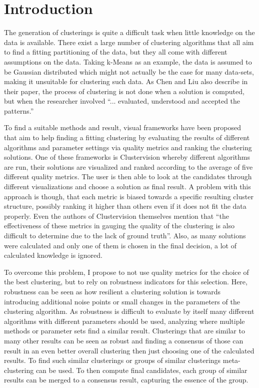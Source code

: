 \iffalse  \fi

\chapter{Introduction}
\label{cha:Introduction}

The generation of clusterings is quite a difficult task when little knowledge on the data is available. There exist a large number of clustering algorithms that all aim to find a fitting partitioning of the data, but they all come with different assumptions on the data. Taking k-Means as an example, the data is assumed to be Gaussian distributed which might not actually be the case for many data-sets, making it unsuitable for clustering such data. As Chen and Liu \cite{VISTA} also describe in their paper, the process of clustering is not done when a solution is computed, but when the researcher involved ``... evaluated, understood and accepted the patterns.''

To find a suitable methods and result, visual frameworks have been proposed that aim to help finding a fitting clustering by evaluating the results of different algorithms and parameter settings via quality metrics and ranking the clustering solutions. One of these frameworks is Clustervision \cite{Kwon2018ClustervisionVS} whereby different algorithms are run, their solutions are visualized and ranked according to the average of five different quality metrics. The user is then able to look at the candidates through different visualizations and choose a solution as final result. A problem with this approach is though, that each metric is biased towards a specific resulting cluster structure, possibly ranking it higher than others even if it does not fit the data properly. Even the authors of Clustervision themselves mention that ``the effectiveness of these metrics in gauging the quality of the clustering is also difficult to determine due to the lack of ground truth''. Also, as many solutions were calculated and only one of them is chosen in the final decision, a lot of calculated knowledge is ignored.

To overcome this problem, I propose to not use quality metrics for the choice of the best clustering, but to rely on robustness indicators for this selection. Here, robustness can be seen as how resilient a clustering solution is towards introducing additional noise points or small changes in the parameters of the clustering algorithm. As robustness is difficult to evaluate by itself many different algorithms with different parameters should be used, analyzing where multiple methods or parameter sets find a similar result. Clusterings that are similar to many other results can be seen as robust and finding a consensus of those can result in an even better overall clustering then just choosing one of the calculated results. To find such similar clusterings or groups of similar clusterings meta-clustering can be used. To then compute final candidates, each group of similar results can be merged to a consensus result, capturing the essence of the group. 

